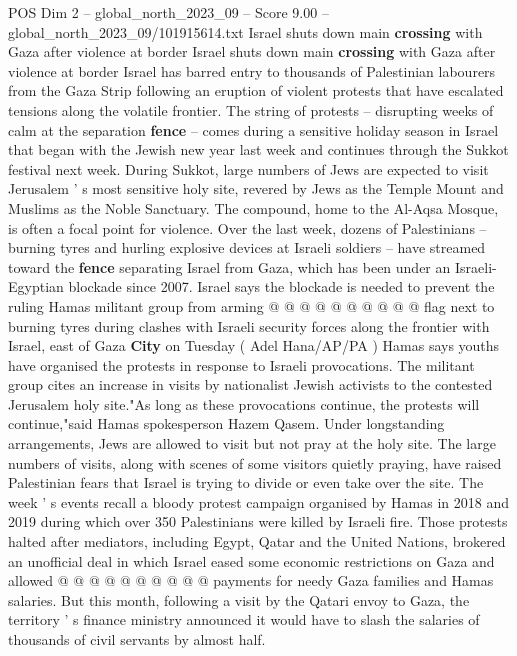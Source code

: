 \begin{textsample}{POS Dim 2 – global\_north\_2023\_09 – Score 9.00 – global\_north\_2023\_09/101915614.txt}  \label{ex:f2_pos_379}
Israel shuts down main \textbf{crossing} with Gaza after violence at border Israel shuts down main \textbf{crossing} with Gaza after violence at border Israel has barred entry to thousands of Palestinian labourers from the Gaza Strip following an eruption of violent protests that have escalated tensions along the volatile frontier.
The string of protests -- disrupting weeks of calm at the separation \textbf{fence} -- comes during a sensitive holiday season in Israel that began with the Jewish new year last week and continues through the Sukkot festival next week.
During Sukkot, large numbers of Jews are expected to visit Jerusalem ' s most sensitive holy site, revered by Jews as the Temple Mount and Muslims as the Noble Sanctuary.
The compound, home to the Al-Aqsa Mosque, is often a focal point for violence.
Over the last week, dozens of Palestinians -- burning tyres and hurling explosive devices at Israeli soldiers -- have streamed toward the \textbf{fence} separating Israel from Gaza, which has been under an Israeli-Egyptian blockade since 2007.
Israel says the blockade is needed to prevent the ruling Hamas militant group from arming @ @ @ @ @ @ @ @ @ @ flag next to burning tyres during clashes with Israeli security forces along the frontier with Israel, east of Gaza \textbf{City} on Tuesday ( Adel Hana/AP/PA ) Hamas says youths have organised the protests in response to Israeli provocations.
The militant group cites an increase in visits by nationalist Jewish activists to the contested Jerusalem holy site."As long as these provocations continue, the protests will continue,"said Hamas spokesperson Hazem Qasem.
Under longstanding arrangements, Jews are allowed to visit but not pray at the holy site.
The large numbers of visits, along with scenes of some visitors quietly praying, have raised Palestinian fears that Israel is trying to divide or even take over the site.
The week ' s events recall a bloody protest campaign organised by Hamas in 2018 and 2019 during which over 350 Palestinians were killed by Israeli fire.
Those protests halted after mediators, including Egypt, Qatar and the United Nations, brokered an unofficial deal in which Israel eased some economic restrictions on Gaza and allowed @ @ @ @ @ @ @ @ @ @ payments for needy Gaza families and Hamas salaries.
But this month, following a visit by the Qatari envoy to Gaza, the territory ' s finance ministry announced it would have to slash the salaries of thousands of civil servants by almost half.

\end{textsample}
